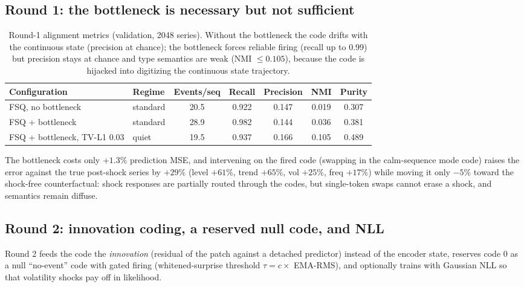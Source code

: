 \subsection{Round 1: the bottleneck is necessary but not sufficient}

\begin{table}[t]
\caption{Round-1 alignment metrics (validation, 2048 series). Without the bottleneck the code drifts with the continuous state (precision at chance); the bottleneck forces reliable firing (recall up to 0.99) but precision stays at chance and type semantics are weak (NMI $\le 0.105$), because the code is hijacked into digitizing the continuous state trajectory.}
\label{tab:action_v1}
\centering\small
\begin{tabular}{llccccc}
\toprule
Configuration & Regime & Events/seq & Recall & Precision & NMI & Purity \\
\midrule
FSQ, no bottleneck & standard & 20.5 & 0.922 & 0.147 & 0.019 & 0.307 \\
FSQ + bottleneck & standard & 28.9 & 0.982 & 0.144 & 0.036 & 0.381 \\
FSQ + bottleneck, TV-L1 0.03 & quiet & 19.5 & 0.937 & 0.166 & 0.105 & 0.489 \\
\bottomrule
\end{tabular}
\end{table}

The bottleneck costs only $+1.3\%$ prediction MSE, and intervening on the fired code (swapping in the calm-sequence mode code) raises the error against the true post-shock series by $+29\%$ (level $+61\%$, trend $+65\%$, vol $+25\%$, freq $+17\%$) while moving it only $-5\%$ toward the shock-free counterfactual: shock responses are partially routed through the codes, but single-token swaps cannot erase a shock, and semantics remain diffuse.

\subsection{Round 2: innovation coding, a reserved null code, and NLL}

Round 2 feeds the code the \emph{innovation} (residual of the patch against a detached predictor) instead of the encoder state, reserves code 0 as a null ``no-event'' code with gated firing (whitened-surprise threshold $\tau = c \times$ EMA-RMS), and optionally trains with Gaussian NLL so that volatility shocks pay off in likelihood.

